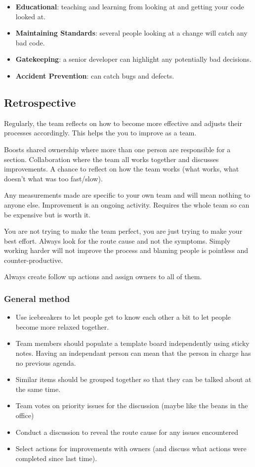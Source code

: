 \begin{itemize}
    \item \textbf{Educational}: teaching and learning from looking at and getting your code looked at.
    \item \textbf{Maintaining Standards}: several people looking at a change will catch any bad code.
    \item \textbf{Gatekeeping}: a senior developer can highlight any potentially bad decisions.
    \item \textbf{Accident Prevention}: can catch bugs and defects.
\end{itemize}

\subsection{Retrospective}\label{sub:retrospective}

Regularly, the team reflects on how to become more effective and adjusts their processes accordingly.
This helps the you to improve as a team.

Boosts shared ownership where more than one person are responsible for a section.
Collaboration where the team all works together and discusses improvements.
A chance to reflect on how the team works (what works, what doesn't what was too fast/slow).

Any measurements made are specific to your own team and will mean nothing to anyone else.
Improvement is an ongoing activity.
Requires the whole team so can be expensive but is worth it.

You are not trying to make the team perfect, you are just trying to make your best effort.
Always look for the route cause and not the symptoms.
Simply working harder will not improve the process and blaming people is pointless and counter-productive.

Always create follow up actions and assign owners to all of them.

\subsubsection{General method}\label{ssub:general_method}

\begin{itemize}
    \item Use icebreakers to let people get to know each other a bit to let people become more relaxed together.
    \item Team members should populate a template board independently using sticky notes. Having an independant person can mean that the person in charge has no previous agenda.
    \item Similar items should be grouped together so that they can be talked about at the same time.
    \item Team votes on priority issues for the discussion (maybe like the beans in the office)
    \item Conduct a discussion to reveal the route cause for any issues encountered
    \item Select actions for improvements with owners (and discuss what actions were completed since last time).
\end{itemize}

